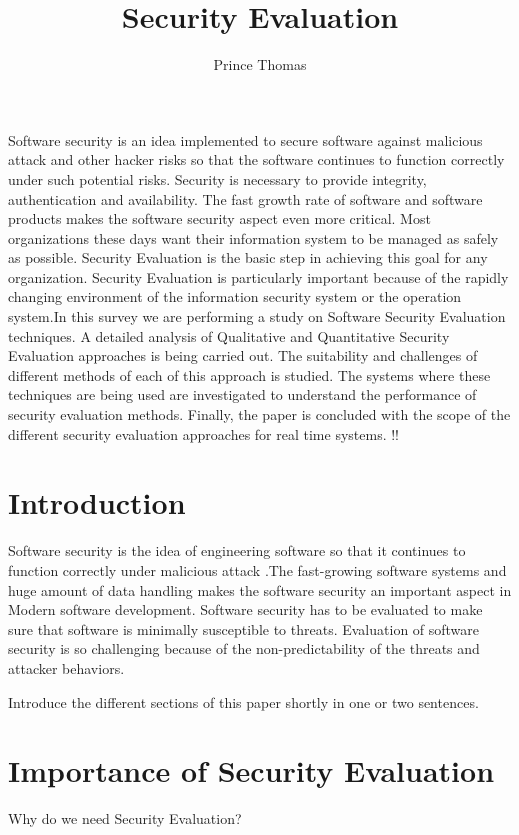 \documentclass[pdftex,english,oribibl]{llncs}
\title{Security Evaluation}
\author{Prince Thomas}
\institute{University of Stuttgart\\Institute of Software Technology (ISTE)\\70569 Stuttgart, Germany}
\makeatletter
\gdef\@keywords{}
\renewenvironment{abstract}{%
  \list{}{\advance\topsep by0.35cm\relax\small%
          \leftmargin=1cm%
          \labelwidth=\z@%
          \listparindent=\z@%
          \itemindent\listparindent%
          \rightmargin\leftmargin}%
          \item[\hskip\labelsep\bfseries\abstractname]}{%
  \if!\@keywords!\else{\item[~]\item[\hskip\labelsep\bfseries\keywordname]\@keywords}\fi%
  \endlist}
\makeatother
\begin{document}
\maketitle

\begin{abstract}
Software security is an idea implemented to secure software against malicious attack and other hacker risks so that the software continues to function correctly under such potential risks. Security is necessary to provide integrity, authentication and availability. The fast growth rate of software and software products makes the software security aspect even more critical. Most organizations these days want their information system to be managed as safely as possible. Security Evaluation is the basic step in achieving this goal for any organization. Security Evaluation is particularly important because of the rapidly changing environment of the information security system or the operation system.In this survey we are performing a study on Software Security Evaluation techniques. A detailed analysis of Qualitative and Quantitative Security Evaluation approaches is being carried out. The suitability and challenges of different methods of each of this approach is studied. The systems where these techniques are being used are investigated to understand the performance of security evaluation methods. Finally, the paper is concluded with the scope of the different security evaluation approaches for real time systems.
\end{abstract}

\section{Introduction}

  Software security is the idea of engineering software so that it continues to function correctly under malicious attack \cite{1281254} .The fast-growing software systems and huge amount of data handling makes the software security an important aspect in Modern software development. Software security has to be evaluated to make sure that software is minimally susceptible to threats. Evaluation of software security is so challenging because of the non-predictability of the threats and attacker behaviors.

  Introduce the different sections of this paper shortly in one or two sentences.

  
\section{Importance of Security Evaluation}
Why do we need Security Evaluation?
\end{document}
